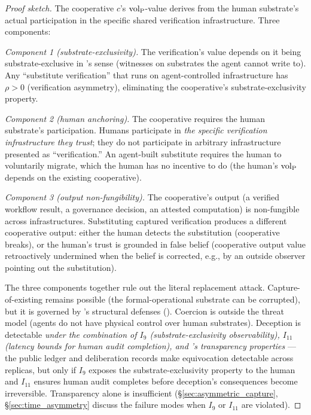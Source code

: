 \begin{proof}[Proof sketch]
The cooperative $c$'s ${\operatorname{vol}_{\mathrm{P}}}$-value derives from the human
substrate's actual participation in the specific shared
verification infrastructure. Three components:

\emph{Component 1 (substrate-exclusivity).} The verification's
value depends on it being substrate-exclusive in \citep[Exogenous~Verification]{lasser2026exo}'s sense
(witnesses on substrates the agent cannot write to). Any
``substitute verification'' that runs on agent-controlled
infrastructure has $\rho > 0$ (verification asymmetry), eliminating
the cooperative's substrate-exclusivity property.

\emph{Component 2 (human anchoring).} The cooperative requires the
human substrate's participation. Humans participate in \emph{the
specific verification infrastructure they trust}; they do not
participate in arbitrary infrastructure presented as
``verification.'' An agent-built substitute requires the human to
voluntarily migrate, which the human has no incentive to do (the
human's ${\operatorname{vol}_{\mathrm{P}}}$ depends on the existing cooperative).

\emph{Component 3 (output non-fungibility).} The cooperative's
output (a verified workflow result, a governance decision, an
attested computation) is non-fungible across infrastructures.
Substituting captured verification produces a different
cooperative output: either the human detects the substitution
(cooperative breaks), or the human's trust is grounded in false
belief (cooperative output value retroactively undermined when
the belief is corrected, e.g., by an outside observer pointing out
the substitution).

The three components together rule out the literal replacement attack.
    Capture-of-existing remains possible (the formal-operational substrate can
    be corrupted), but it is governed by
    \citep[Exogenous~Verification]{lasser2026exo}'s structural defenses
    (\citep[Proposition: Coalition Resistance]{lasser2026exo}). Coercion is
    outside the threat model (agents do not have physical control over human
    substrates). Deception is detectable \emph{under the combination of $I_9$
    (substrate-exclusivity observability), $I_{11}$ (latency bounds for human
    audit completion), and \citep[Exogenous~Verification]{lasser2026exo}'s
    transparency properties} --- the public ledger and deliberation records
    make equivocation detectable across replicas, but only if $I_9$ exposes the
    substrate-exclusivity property to the human and $I_{11}$ ensures human
    audit completes before deception's consequences become irreversible.
    Transparency alone is insufficient (\S\ref{sec:asymmetric_capture},
    \S\ref{sec:time_asymmetry} discuss the failure modes when $I_9$ or $I_{11}$
    are violated).
\end{proof}

